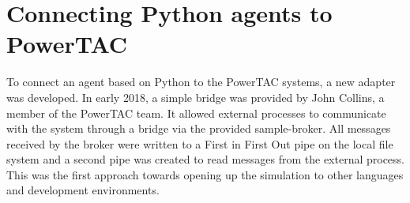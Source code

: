 
%
%


\section{Connecting Python agents to PowerTAC}%
\label{sec:connecting_python_agents_to_powertac}



To connect an agent based on Python to the \ac{PowerTAC} systems, a new adapter was developed. In early 2018, a simple bridge
was provided by John Collins, a member of the \ac {PowerTAC} team. It allowed external processes to communicate with the
system through a bridge via the provided sample-broker. All messages received by the broker were written to a First in
First Out pipe on the local file system and a second pipe was created to read messages from the external process. This
was the first approach towards opening up the simulation to other languages and development environments.


